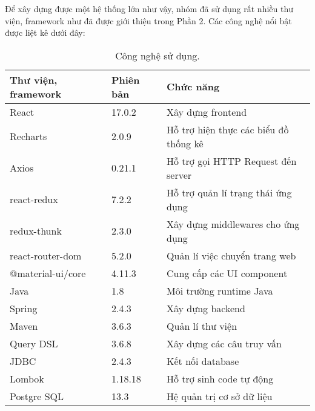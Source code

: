 Để xây dựng được một hệ thống lớn như vậy, nhóm đã sử dụng rất nhiều thư viện, framework như đã được giới thiệu trong Phần 2. Các công nghệ nổi bật được liệt kê dưới đây:

\begin{table}[h]
    \centering
    \begin{tabular}{|m{4cm}|m{2cm}|m{4cm}|}
    \hline 
        \textbf{Thư viện, framework} & \textbf{Phiên bản} & \textbf{Chức năng}\\ \hline
        React & 17.0.2 & Xây dựng frontend \\ \hline
        Recharts & 2.0.9 & Hỗ trợ hiện thực các biểu đồ thống kê \\ \hline
        Axios & 0.21.1 & Hỗ trợ gọi HTTP Request đến server \\ \hline
        react-redux & 7.2.2 & Hỗ trợ quản lí trạng thái ứng dụng \\ \hline
        redux-thunk & 2.3.0 & Xây dựng middlewares cho ứng dụng \\ \hline
        react-router-dom & 5.2.0 & Quản lí việc chuyển trang web \\ \hline
        @material-ui/core & 4.11.3 & Cung cấp các UI component \\ \hline
        Java & 1.8 & Môi trường runtime Java \\ \hline
        Spring & 2.4.3 & Xây dựng backend \\ \hline
        Maven & 3.6.3 & Quản lí thư viện \\ \hline
        Query DSL & 3.6.8 & Xây dựng các câu truy vấn \\ \hline
        JDBC & 2.4.3 & Kết nối database \\ \hline
        Lombok & 1.18.18 & Hỗ trợ sinh code tự động \\ \hline
        Postgre SQL & 13.3 & Hệ quản trị cơ sở dữ liệu \\ \hline
    \end{tabular}
    \caption{Công nghệ sử dụng.}
    \label{usedtech}
\end{table}